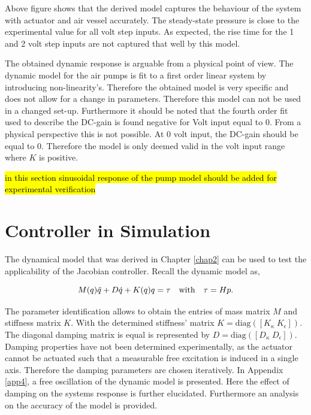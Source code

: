 Above figure shows that the derived model captures the behaviour of the system with actuator and air vessel accurately. The steady-state pressure is close to the experimental value for all volt step inputs. As expected, the rise time for the 1 and 2 volt step inputs are not captured that well by this model.

The obtained dynamic response is arguable from a physical point of view. The dynamic model for the air pumps is fit to a first order linear system by introducing non-linearity's. Therefore the obtained model is very specific and does not allow for a change in parameters. Therefore this model can not be used in a changed set-up. Furthermore it should be noted that the fourth order fit used to describe the DC-gain is found negative for Volt input equal to 0. From a physical perspective this is not possible. At 0 volt input, the DC-gain should be equal to 0. Therefore the model is only deemed valid in the volt input range where $K$ is positive.

\hl{in this section sinusoidal response of the pump model should be added for experimental verification}


\section{Controller in Simulation}

The dynamical model that was derived in Chapter \ref{chap2} can be used to test the applicability of the Jacobian controller. Recall the dynamic model as, 


\begin{equation}
    M(q)\Ddot{q} + D\dot{q} + K(q)q = \tau \hspace{10pt} \text{with} \hspace{10pt} \tau = Hp.
    \label{eq4:dynamicmodel}
\end{equation}

The parameter identification allows to obtain the entries of mass matrix $M$ and stiffness matrix $K$. With the determined stiffness' matrix $K = \text{diag}([K_\kappa \hspace{3pt} K_\epsilon])$. The diagonal damping matrix is equal is represented by $D = \text{diag}([D_\kappa \hspace{3pt} D_\epsilon])$. Damping properties have not been determined experimentally, as the actuator cannot be actuated such that a measurable free excitation is induced in a single axis. Therefore the damping parameters are chosen iteratively. In Appendix \ref{app4}, a free oscillation of the dynamic model is presented. Here the effect of damping on the systems response is further elucidated. Furthermore an analysis on the accuracy of the model is provided.

